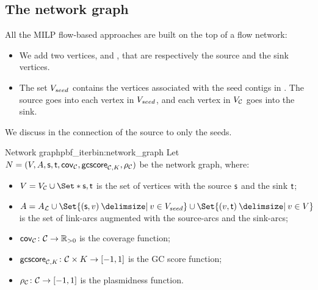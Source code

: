 \subsection{The network graph}\label{sec:pbf_iterbin:network}

All the MILP flow-based approaches are built on the top of a flow network:

\begin{itemize}
  \item We add two vertices, \source{} and \sink{}, that are respectively the source and the sink vertices.
  \item The set \(V_{seed}{}\) contains the vertices associated with the seed contigs in \ContigSeeds{}.
    The source goes into each vertex in \(V_{seed}{}\), and each vertex in \(V_{\mathcal{C}{}}\) goes into the sink.
\end{itemize}

\begin{notebox}
  We discuss in  the connection of the source to only the seeds.
\end{notebox}

\begin{definition}{Network graph}{pbf_iterbin:network_graph}
  Let \(N = (V, A, \mathsf{s}{}, \mathsf{t}{}, \mathsf{cov}_{\mathcal{C}{}}, \mathsf{gcscore}_{\mathcal{C}{}, K}, \rho_{\mathcal{C}{}})\) be the network graph, where:

  \begin{itemize}
    \item \( V = V_\Contigs{} \cup \Set*{\source{}, \sink{}} \) is the set of vertices with the source \(\mathsf{s}{}\) and the sink \(\mathsf{t}{}\);
    \item \( A = A_\Links{} \cup \Set{(\source, v) \given v \in \VSeeds{}} \cup \Set{(v, \sink) \given v \in V} \) is the set of link-arcs augmented with the source-arcs and the sink-arcs;
    \item \( \mathsf{cov}_{\mathcal{C}{}} \colon \mathcal{C}{} \to \mathbb{R}{}_{> 0} \) is the coverage function;
    \item \( \mathsf{gcscore}_{\mathcal{C}{}, K} \colon \mathcal{C}{} \times K \to [-1, 1] \) is the GC score function;
    \item \( \rho_{\mathcal{C}{}} \colon \mathcal{C}{} \to [-1, 1] \) is the plasmidness function.
  \end{itemize}
\end{definition}
